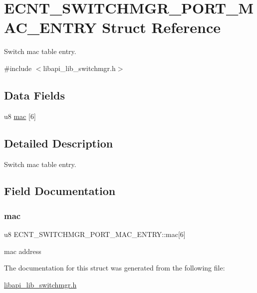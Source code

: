 \hypertarget{structECNT__SWITCHMGR__PORT__MAC__ENTRY}{}\section{E\+C\+N\+T\+\_\+\+S\+W\+I\+T\+C\+H\+M\+G\+R\+\_\+\+P\+O\+R\+T\+\_\+\+M\+A\+C\+\_\+\+E\+N\+T\+RY Struct Reference}
\label{structECNT__SWITCHMGR__PORT__MAC__ENTRY}


Switch mac table entry.  




{\ttfamily \#include $<$libapi\+\_\+lib\+\_\+switchmgr.\+h$>$}

\subsection*{Data Fields}
\begin{DoxyCompactItemize}
\item 
u8 \hyperlink{structECNT__SWITCHMGR__PORT__MAC__ENTRY_a1c7aaa870cdedfa32cd96667bc1ad541}{mac} \mbox{[}6\mbox{]}
\end{DoxyCompactItemize}


\subsection{Detailed Description}
Switch mac table entry. 

\subsection{Field Documentation}
\mbox{\label{structECNT__SWITCHMGR__PORT__MAC__ENTRY_a1c7aaa870cdedfa32cd96667bc1ad541}} 
\subsubsection{\texorpdfstring{mac}{mac}}
{\footnotesize\ttfamily u8 E\+C\+N\+T\+\_\+\+S\+W\+I\+T\+C\+H\+M\+G\+R\+\_\+\+P\+O\+R\+T\+\_\+\+M\+A\+C\+\_\+\+E\+N\+T\+R\+Y\+::mac\mbox{[}6\mbox{]}}

mac address 

The documentation for this struct was generated from the following file\+:\begin{DoxyCompactItemize}
\item 
\hyperlink{libapi__lib__switchmgr_8h}{libapi\+\_\+lib\+\_\+switchmgr.\+h}\end{DoxyCompactItemize}
